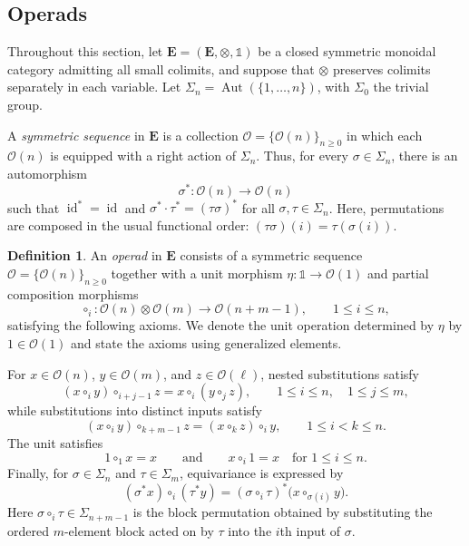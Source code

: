 \documentclass{amsart}
\newcommand{\bE}{\mathbf{E}}
\newcommand{\calO}{\mathcal{O}}
\newcommand{\id}{\operatorname{id}}
\newcommand{\Aut}{\operatorname{Aut}}
\theoremstyle{definition}
\newtheorem{definition}[theorem]{Definition}%
\numberwithin{equation}{section}
\begin{document}
\subsection{Operads}
\label{subsec: operads}

Throughout this section, let $\bE=(\bE,\otimes,\mathbb{1})$ be a closed symmetric monoidal category admitting all small colimits, and suppose that $\otimes$ preserves colimits separately in each variable. Let $\Sigma_n=\Aut(\{1,\ldots,n\})$, with $\Sigma_0$ the trivial group.

A \emph{symmetric sequence} in $\bE$ is a collection $\calO=\{\calO(n)\}_{n\geq 0}$ in which each $\calO(n)$ is equipped with a right action of $\Sigma_n$. Thus, for every $\sigma\in\Sigma_n$, there is an automorphism
\[
\sigma^*\colon\calO(n)\longrightarrow\calO(n)
\]
such that $\id^*=\id$ and $\sigma^*\cdot\tau^*=(\tau\sigma)^*$ for all $\sigma,\tau\in\Sigma_n$. Here, permutations are composed in the usual functional order: $(\tau\sigma)(i)=\tau(\sigma(i))$.

\begin{definition}
\label{def: operad}
An \emph{operad} in $\bE$ consists of a symmetric sequence
$\calO=\{\calO(n)\}_{n\geq 0}$ together with a unit morphism
$\eta\colon\mathbb{1}\to\calO(1)$ and partial composition morphisms
\[
\circ_i\colon\calO(n)\otimes\calO(m)
\longrightarrow\calO(n+m-1),
\qquad 1\leq i\leq n,
\]
satisfying the following axioms. We denote the unit operation determined
by $\eta$ by $1\in\calO(1)$ and state the axioms using generalized
elements.

For $x\in\calO(n)$, $y\in\calO(m)$, and $z\in\calO(\ell)$, nested
substitutions satisfy
\begin{equation}
\label{eq:operad-associativity-nested}
(x\circ_i y)\circ_{i+j-1}z
=
x\circ_i(y\circ_j z),
\qquad 1\leq i\leq n,\quad 1\leq j\leq m,
\end{equation}
while substitutions into distinct inputs satisfy
\begin{equation}
\label{eq:operad-associativity-disjoint}
(x\circ_i y)\circ_{k+m-1}z
=
(x\circ_k z)\circ_i y,
\qquad 1\leq i<k\leq n.
\end{equation}
The unit satisfies
\begin{equation}
\label{eq:operad-unit}
1\circ_1x=x 
\qquad \text{and} \qquad
x\circ_i1=x
\quad\text{for }1\leq i\leq n.
\end{equation}
Finally, for $\sigma\in\Sigma_n$ and $\tau\in\Sigma_m$, equivariance
is expressed by
\begin{equation}
\label{eq:operad-equivariance}
(\sigma^*x)\circ_i(\tau^*y)
=
(\sigma\circ_i\tau)^*
\bigl(x\circ_{\sigma(i)}y\bigr).
\end{equation}
Here $\sigma\circ_i\tau\in\Sigma_{n+m-1}$ is the block permutation
obtained by substituting the ordered $m$-element block acted on by
$\tau$ into the $i$th input of $\sigma$.
\end{definition}
\end{document}
